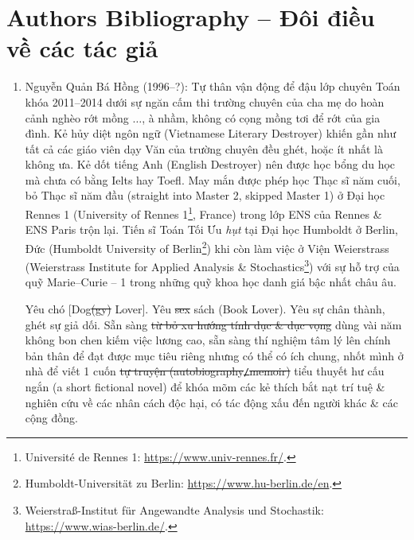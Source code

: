 \documentclass[12pt,oneside]{book}
\begin{document}
\chapter{Authors Bibliography -- Đôi điều về các tác giả}
\minitoc
\begin{enumerate}
	\item {\sc Nguyễn Quản Bá Hồng} (1996--?): Tự thân vận động để đậu lớp chuyên Toán khóa 2011--2014 dưới sự ngăn cấm thi trường chuyên của cha mẹ do hoàn cảnh nghèo rớt mồng $\ldots$, à nhầm, không có cọng mồng tơi để rớt của gia đình. Kẻ hủy diệt ngôn ngữ (Vietnamese Literary Destroyer) khiến gần như tất cả các giáo viên dạy Văn của trường chuyên đều ghét, hoặc ít nhất là không ưa. Kẻ dốt tiếng Anh (English Destroyer) nên được học bổng du học mà chưa có bằng {\sc Ielts} hay {\sc Toefl}. May mắn được phép học Thạc sĩ năm cuối, bỏ Thạc sĩ năm đầu (straight into Master 2, skipped Master 1) ở Đại học Rennes 1 (University of Rennes 1\footnote{Universit\'e de Rennes 1: \url{https://www.univ-rennes.fr/}.}, France) trong lớp ENS của Rennes \& ENS Paris trộn lại. Tiến sĩ Toán Tối Ưu {\it hụt} tại Đại học Humboldt ở Berlin, Đức (Humboldt University of Berlin\footnote{Humboldt-Universität zu Berlin: \url{https://www.hu-berlin.de/en}.}) khi còn làm việc ở Viện Weierstrass (Weierstrass Institute for Applied Analysis \& Stochastics\footnote{Weierstraß-Institut für Angewandte Analysis und Stochastik: \url{https://www.wias-berlin.de/}.}) với sự hỗ trợ của quỹ Marie--Curie -- 1 trong những quỹ khoa học danh giá bậc nhất châu {\sc âu}.
	
	Yêu chó [Dog\st{(gy)} Lover]. Yêu \st{sex} sách (Book Lover). Yêu sự chân thành, ghét sự giả dối. Sẵn sàng \st{từ bỏ xu hướng tính dục \& dục vọng} dùng vài năm không bon chen kiếm việc lương cao, sẵn sàng thí nghiệm tâm lý lên chính bản thân để đạt được mục tiêu riêng nhưng có thể có ích chung, nhốt mình ở nhà để viết 1 cuốn \st{tự truyện (autobiography{\tt/}memoir)} tiểu thuyết hư cấu ngắn (a short fictional novel) để khóa mõm các kẻ thích bắt nạt trí tuệ \& nghiên cứu về các nhân cách độc hại, có tác động xấu đến người khác \& các cộng đồng.
	

\end{enumerate}
\end{document}
